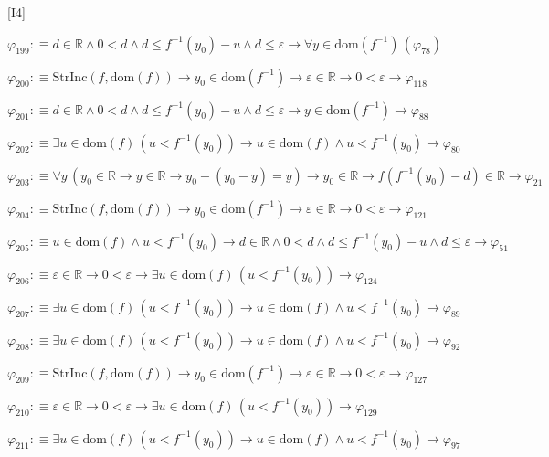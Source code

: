 \begin{fullproof}{[I4]}
\begin{abbrevlist}
\item $\varphi_{199} :\equiv d \in \mathbb{R} \land 0 < d \land d \leq f^{-1}(y_{0}) - u \land d \leq \varepsilon \to \forall y \in \mathrm{dom}(f^{-1})\,(\varphi_{78})$
\item $\varphi_{200} :\equiv \mathrm{StrInc}(f,\mathrm{dom}(f)) \to y_{0} \in \mathrm{dom}(f^{-1}) \to \varepsilon \in \mathbb{R} \to 0 < \varepsilon \to \varphi_{118}$
\item $\varphi_{201} :\equiv d \in \mathbb{R} \land 0 < d \land d \leq f^{-1}(y_{0}) - u \land d \leq \varepsilon \to y \in \mathrm{dom}(f^{-1}) \to \varphi_{88}$
\item $\varphi_{202} :\equiv \exists u \in \mathrm{dom}(f)\,(u < f^{-1}(y_{0})) \to u \in \mathrm{dom}(f) \land u < f^{-1}(y_{0}) \to \varphi_{80}$
\item $\varphi_{203} :\equiv \forall y\,(y_{0} \in \mathbb{R} \to y \in \mathbb{R} \to y_{0} - (y_{0} - y) = y) \to y_{0} \in \mathbb{R} \to f(f^{-1}(y_{0}) - d) \in \mathbb{R} \to \varphi_{21}$
\item $\varphi_{204} :\equiv \mathrm{StrInc}(f,\mathrm{dom}(f)) \to y_{0} \in \mathrm{dom}(f^{-1}) \to \varepsilon \in \mathbb{R} \to 0 < \varepsilon \to \varphi_{121}$
\item $\varphi_{205} :\equiv u \in \mathrm{dom}(f) \land u < f^{-1}(y_{0}) \to d \in \mathbb{R} \land 0 < d \land d \leq f^{-1}(y_{0}) - u \land d \leq \varepsilon \to \varphi_{51}$
\item $\varphi_{206} :\equiv \varepsilon \in \mathbb{R} \to 0 < \varepsilon \to \exists u \in \mathrm{dom}(f)\,(u < f^{-1}(y_{0})) \to \varphi_{124}$
\item $\varphi_{207} :\equiv \exists u \in \mathrm{dom}(f)\,(u < f^{-1}(y_{0})) \to u \in \mathrm{dom}(f) \land u < f^{-1}(y_{0}) \to \varphi_{89}$
\item $\varphi_{208} :\equiv \exists u \in \mathrm{dom}(f)\,(u < f^{-1}(y_{0})) \to u \in \mathrm{dom}(f) \land u < f^{-1}(y_{0}) \to \varphi_{92}$
\item $\varphi_{209} :\equiv \mathrm{StrInc}(f,\mathrm{dom}(f)) \to y_{0} \in \mathrm{dom}(f^{-1}) \to \varepsilon \in \mathbb{R} \to 0 < \varepsilon \to \varphi_{127}$
\item $\varphi_{210} :\equiv \varepsilon \in \mathbb{R} \to 0 < \varepsilon \to \exists u \in \mathrm{dom}(f)\,(u < f^{-1}(y_{0})) \to \varphi_{129}$
\item $\varphi_{211} :\equiv \exists u \in \mathrm{dom}(f)\,(u < f^{-1}(y_{0})) \to u \in \mathrm{dom}(f) \land u < f^{-1}(y_{0}) \to \varphi_{97}$

\end{abbrevlist}
\end{fullproof}
